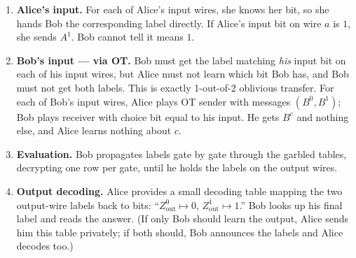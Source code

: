 \begin{enumerate}
  \item \textbf{Alice's input.} For each of Alice's input wires, she knows her bit, so she hands Bob the corresponding label directly. If Alice's input bit on wire $a$ is $1$, she sends $A^1$. Bob cannot tell it means $1$.
  \item \textbf{Bob's input --- via OT.} Bob must get the label matching \emph{his} input bit on each of his input wires, but Alice must not learn which bit Bob has, and Bob must not get both labels. This is exactly 1-out-of-2 oblivious transfer. For each of Bob's input wires, Alice plays OT sender with messages $(B^0, B^1)$; Bob plays receiver with choice bit equal to his input. He gets $B^{c}$ and nothing else, and Alice learns nothing about $c$.
  \item \textbf{Evaluation.} Bob propagates labels gate by gate through the garbled tables, decrypting one row per gate, until he holds the labels on the output wires.
  \item \textbf{Output decoding.} Alice provides a small decoding table mapping the two output-wire labels back to bits: ``$Z^0_{\text{out}} \mapsto 0$, $Z^1_{\text{out}} \mapsto 1$.'' Bob looks up his final label and reads the answer. (If only Bob should learn the output, Alice sends him this table privately; if both should, Bob announces the labels and Alice decodes too.)
\end{enumerate}


